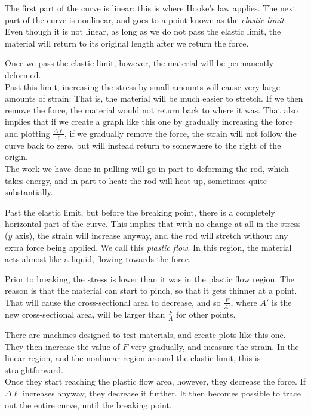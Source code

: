 The first part of the curve is linear: this is where Hooke's law applies. The next part of the curve is nonlinear, and goes to a point known as the \emph{elastic limit}. Even though it is not linear, as long as we do not pass the elastic limit, the material will return to its original length after we return the force.

Once we pass the elastic limit, however, the material will be permanently deformed.\\
Past this limit, increasing the stress by small amounts will cause very large amounts of strain: That is, the material will be much easier to stretch. If we then remove the force, the material would not return back to where it was. That also implies that if we create a graph like this one by gradually increasing the force and plotting $\displaystyle \frac{\Delta \ell}{\ell}$, if we gradually remove the force, the strain will not follow the curve back to zero, but will instead return to somewhere to the right of the origin.\\
The work we have done in pulling will go in part to deforming the rod, which takes energy, and in part to heat: the rod will heat up, sometimes quite substantially.

Past the elastic limit, but before the breaking point, there is a completely horizontal part of the curve. This implies that with no change at all in the stress ($y$ axis), the strain will increase anyway, and the rod will stretch without any extra force being applied. We call this \emph{plastic flow}. In this region, the material acts almost like a liquid, flowing towards the force.

Prior to breaking, the stress is lower than it was in the plastic flow region. The reason is that the material can start to pinch, so that it gets thinner at a point. That will cause the cross-sectional area to decrease, and so $\displaystyle \frac{F}{A'}$, where $A'$ is the new cross-sectional area, will be larger than $\displaystyle \frac{F}{A}$ for other points.

There are machines designed to test materials, and create plots like this one. They then increase the value of $F$ very gradually, and measure the strain. In the linear region, and the nonlinear region around the elastic limit, this is straightforward.\\
Once they start reaching the plastic flow area, however, they decrease the force. If $\Delta \ell$ increases anyway, they decrease it further. It then becomes possible to trace out the entire curve, until the breaking point.


